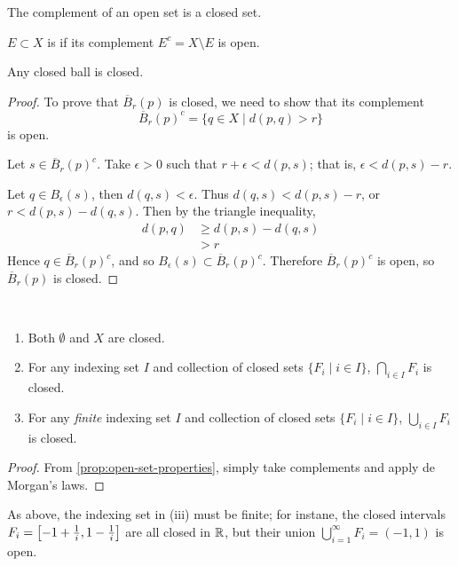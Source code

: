 The complement of an open set is a closed set.

\begin{definition}
$E\subset X$ is  if its complement $E^c=X\setminus E$ is open.
\end{definition}

\begin{proposition}
Any closed ball is closed.
\end{proposition}

\begin{proof}
To prove that $\overline{B}_r(p)$ is closed, we need to show that its complement
\[\overline{B}_r(p)^c=\{q\in X\mid d(p,q)>r\}\]
is open.

Let $s\in\overline{B}_r(p)^c$. Take $\epsilon>0$ such that $r+\epsilon<d(p,s)$; that is, $\epsilon<d(p,s)-r$.

Let $q\in B_\epsilon(s)$, then $d(q,s)<\epsilon$. Thus $d(q,s)<d(p,s)-r$, or $r<d(p,s)-d(q,s)$. Then by the triangle inequality,
\begin{align*}
d(p,q)&\ge d(p,s)-d(q,s)\\
&>r
\end{align*}
Hence $q\in\overline{B}_r(p)^c$, and so $B_\epsilon(s)\subset\overline{B}_r(p)^c$. Therefore $\overline{B}_r(p)^c$ is open, so $\overline{B}_r(p)$ is closed.
\end{proof}

\begin{proposition}\label{prop:closed-set-properties} \
\begin{enumerate}[label=(\roman*)]
\item Both $\emptyset$ and $X$ are closed.
\item For any indexing set $I$ and collection of closed sets $\{F_i\mid i\in I\}$, $\bigcap_{i\in I}F_i$ is closed.
\item For any \emph{finite} indexing set $I$ and collection of closed sets $\{F_i\mid i\in I\}$, $\bigcup_{i\in I}F_i$ is closed.
\end{enumerate}
\end{proposition}

\begin{proof}
From \cref{prop:open-set-properties}, simply take complements and apply de Morgan's laws.
\end{proof}

\begin{remark}
As above, the indexing set in (iii) must be finite; for instane, the closed intervals $F_i=\left[-1+\frac{1}{i},1-\frac{1}{i}\right]$ are all closed in $\mathbb R$, but their union $\bigcup_{i=1}^\infty F_i=(-1,1)$ is open.
\end{remark}

